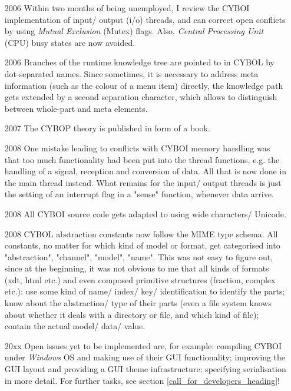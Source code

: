 \begin{itemize}
    \item[2006] Within two months of being unemployed, I review the CYBOI
        implementation of input/ output (i/o) threads, and can correct open
        conflicts by using \emph{Mutual Exclusion} (Mutex) flags.
        Also, \emph{Central Processing Unit} (CPU) busy states are now avoided.
    \item[2006] Branches of the runtime knowledge tree are pointed to in CYBOL
        by dot-separated names. Since sometimes, it is necessary to address meta
        information (such as the colour of a menu item) directly, the knowledge
        path gets extended by a second separation character, which allows to
        distinguish between whole-part and meta elements.
    \item[2007] The CYBOP theory is published in form of a book.
    \item[2008] One mistake leading to conflicts with CYBOI memory handling was
        that too much functionality had been put into the thread functions,
        e.g. the handling of a signal, reception and conversion of data.
        All that is now done in the main thread instead. What remains for the
        input/ output threads is just the setting of an interrupt flag in a
        "sense" function, whenever data arrive.
    \item[2008] All CYBOI source code gets adapted to using wide characters/ Unicode.
    \item[2008] CYBOL abstraction constants now follow the MIME type schema.
        All constants, no matter for which kind of model or format,
        get categorised into "abstraction", "channel", "model", "name".
        This was not easy to figure out, since at the beginning,
        it was not obvious to me that all kinds of formats (xdt, html etc.)
        and even composed primitive structures (fraction, complex etc.):
        use some kind of name/ index/ key/ identification to identify the parts;
        know about the abstraction/ type of their parts (even a file system knows
        about whether it deals with a directory or file, and which kind of file);
        contain the actual model/ data/ value.
    \item[20xx] Open issues yet to be implemented are, for example:
        compiling CYBOI under \emph{Windows} OS and making use of their GUI
        functionality; improving the GUI layout and providing a GUI theme
        infrastructure; specifying serialisation in more detail.
        For further tasks, see section \ref{call_for_developers_heading}!
\end{itemize}
